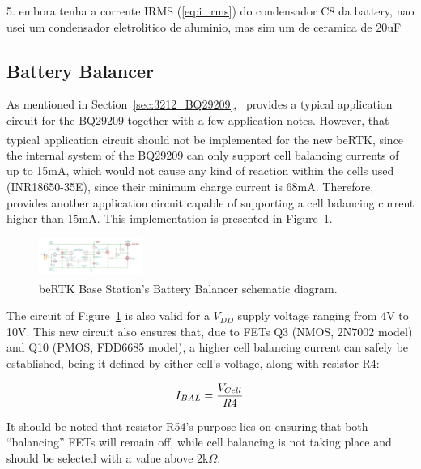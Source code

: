 5. embora tenha a corrente IRMS (\ref{eq:i_rms}) do condensador C8 da battery, nao usei um condensador eletrolitico de aluminio, mas sim um de ceramica de 20uF



\subsection{Battery Balancer}\label{sec:6_BQ29209}
As mentioned in Section~\ref{sec:3212_BQ29209},~\cite{bq29209} provides a typical application circuit for the BQ29209 together with a few application notes. However, that typical application circuit should not be implemented for the new beRTK\textsuperscript{\textregistered}, since the internal system of the BQ29209 can only support cell balancing currents of up to 15mA, which would not cause any kind of reaction within the cells used (INR18650-35E), since their minimum charge current is 68mA. Therefore,~\cite{bq29209} provides another application circuit capable of supporting a cell balancing current higher than 15mA. This implementation is presented in Figure~\ref{fig:BQ29209_circuit_NEW}.
\begin{figure}[h]
    \centering
    \includegraphics[width=0.3\textwidth]{Chapters/Figures/chapter3/Battery_Balancer.pdf}
    \caption{beRTK\textsuperscript{\textregistered} Base Station's Battery Balancer schematic diagram.}
    \label{fig:BQ29209_circuit_NEW}
\end{figure}

The circuit of Figure~\ref{fig:BQ29209_circuit_NEW} is also valid for a $V_{DD}$ supply voltage ranging from 4V to 10V. This new circuit also ensures that, due to FETs Q3 (NMOS, 2N7002 model) and Q10 (PMOS, FDD6685 model), a higher cell balancing current can safely be established, being it defined by either cell's voltage, along with resistor R4:

\begin{equation}\label{eq:IBAL}
	I_{BAL}=\frac{V_{Cell}}{R4}\,\medskip
\end{equation}

\noindent It should be noted that resistor R54's purpose lies on ensuring that both ``balancing'' FETs will remain off, while cell balancing is not taking place and should be selected with a value above 2k$\Omega$.

